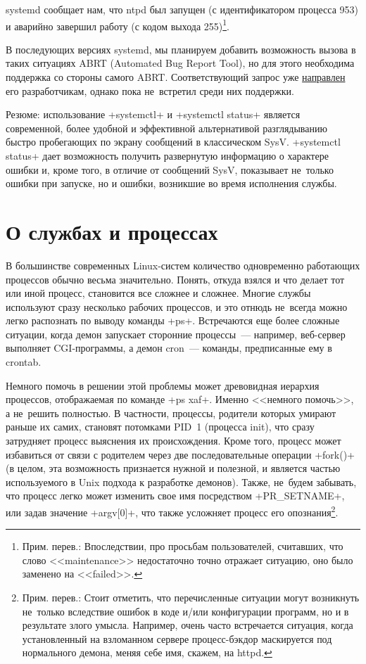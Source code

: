 \documentclass[10pt,oneside,a4paper]{article}
\begin{document}
systemd сообщает нам, что ntpd был запущен (с идентификатором процесса 953) и
аварийно завершил работу (с кодом выхода 255)\footnote{Прим. перев.:
Впоследствии, про просьбам пользователей, считавших, что слово <<maintenance>>
недостаточно точно отражает ситуацию, оно было заменено на <<failed>>.}.

В последующих версиях systemd, мы планируем добавить возможность вызова в
таких ситуациях ABRT (Automated Bug Report Tool), но для этого необходима
поддержка со стороны самого ABRT. Соответствующий запрос уже
\href{https://bugzilla.redhat.com/show_bug.cgi?id=622773}{направлен} его
разработчикам, однако пока не~встретил среди них поддержки.

Резюме: использование +systemctl+ и +systemctl status+ является современной,
более удобной и эффективной альтернативой разглядыванию быстро пробегающих по
экрану сообщений в классическом SysV. +systemctl status+ дает возможность
получить развернутую информацию о характере ошибки и, кроме того, в отличие
от сообщений SysV, показывает не~только ошибки при запуске, но и ошибки,
возникшие во время исполнения службы. 

\section{О службах и процессах}
В большинстве современных Linux-систем количество одновременно работающих
процессов обычно весьма значительно. Понять, откуда взялся и что делает тот
или иной процесс, становится все сложнее и сложнее. Многие службы используют
сразу несколько рабочих процессов, и это отнюдь не~всегда можно легко
распознать по выводу команды +ps+. Встречаются еще более сложные ситуации,
когда демон запускает сторонние процессы~--- например, веб-сервер выполняет
CGI-программы, а демон cron~--- команды, предписанные ему в crontab.

Немного помочь в решении этой проблемы может древовидная иерархия процессов,
отображаемая по команде +ps xaf+. Именно <<немного помочь>>, а не~решить
полностью. В частности, процессы, родители которых умирают раньше их самих,
становят потомками PID~1 (процесса init), что сразу затрудняет процесс
выяснения их происхождения. Кроме того, процесс может избавиться от связи с
родителем через две последовательные операции +fork()+ (в целом, эта возможность
признается нужной и полезной, и является частью используемого в Unix подхода
к разработке демонов). Также, не~будем забывать, что процесс легко может
изменить свое имя посредством +PR_SETNAME+, или задав значение
+argv[0]+, что также усложняет процесс его опознания\footnote{Прим.
перев.: Стоит отметить, что перечисленные ситуации могут возникнуть не~только
вследствие ошибок в коде и/или конфигурации программ, но и в результате злого
умысла. Например, очень часто встречается ситуация, когда установленный на
взломанном сервере процесс-бэкдор маскируется под нормального демона, меняя
себе имя, скажем, на httpd.}.
\end{document}
